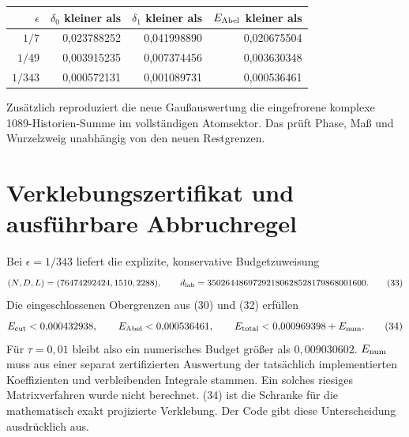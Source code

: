 \documentclass[10pt,a4paper]{article}
\begin{document}
\begin{center}\begin{tabular}{rrrr}\toprule
$\epsilon$&$\delta_0$ kleiner als&$\delta_1$ kleiner als&$E_{\rm Abel}$ kleiner als\\\midrule
$1/7$&0,023788252&0,041998890&0,020675504\\
$1/49$&0,003915235&0,007374456&0,003630348\\
$1/343$&0,000572131&0,001089731&0,000536461\\\bottomrule
\end{tabular}\end{center}
Zusätzlich reproduziert die neue Gaußauswertung die eingefrorene komplexe
1089-Historien-Summe im vollständigen Atomsektor. Das prüft Phase, Maß und
Wurzelzweig unabhängig von den neuen Restgrenzen.
\newpage

\section{Verklebungszertifikat und ausführbare Abbruchregel}
Bei $\epsilon=1/343$ liefert die explizite, konservative Budgetzuweisung
\[
 (N,D,L)=(76474292424,1510,2288),\qquad
 d_{\rm lab}=35026448697292180628528179868001600.            \tag{33}
\]
Die eingeschlossenen Obergrenzen aus (30) und (32) erfüllen
\[
 E_{\rm cut}<0{,}000432938,\qquad
 E_{\rm Abel}<0{,}000536461,\qquad
 E_{\rm total}<0{,}000969398+E_{\rm num}.                  \tag{34}
\]
Für $\tau=0{,}01$ bleibt also ein numerisches Budget größer als
$0{,}009030602$. $E_{\rm num}$ muss aus einer separat zertifizierten
Auswertung der tatsächlich implementierten Koeffizienten und verbleibenden
Integrale stammen. Ein solches riesiges Matrixverfahren wurde nicht
berechnet. (34) ist die Schranke für die mathematisch exakt projizierte
Verklebung. Der Code gibt diese Unterscheidung ausdrücklich aus.
\end{document}
